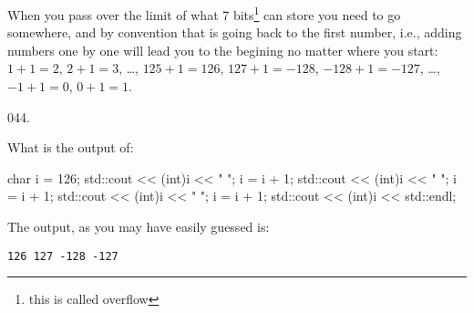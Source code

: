 \documentclass[]{book}
\newenvironment{Shaded}{}{}
\newcommand{\BuiltInTok}[1]{#1}
\newcommand{\DataTypeTok}[1]{\textcolor[rgb]{0.56,0.13,0.00}{#1}}
\newcommand{\DecValTok}[1]{\textcolor[rgb]{0.25,0.63,0.44}{#1}}
\newcommand{\NormalTok}[1]{#1}
\newcommand{\StringTok}[1]{\textcolor[rgb]{0.25,0.44,0.63}{#1}}
\begin{document}
\begin{minipage}{\linewidth}
\begin{minipage}[t]{.485\linewidth}
When you pass over the limit of what 7 bits\footnote{this is called
  overflow} can store you need to go somewhere, and by convention that
is going back to the first number, i.e., adding numbers one by one will
lead you to the begining no matter where you start: \(1+1=2\),
\(2+1=3\), \ldots{}, \(125+1=126\), \(127+1=-128\), \(-128+1=-127\),
\ldots{}, \(-1+1=0\), \(0+1=1\).

\end{minipage}
\end{minipage}

\vspace{2mm}\noindent\hrulefill{}

\begin{minipage}{\linewidth}\noindent
{\tiny 044.}\\
\begin{minipage}[t]{.485\linewidth}

What is the output of:

\begin{framed}

\begin{Shaded}
\begin{Highlighting}[]
\DataTypeTok{char}\NormalTok{ i = }\DecValTok{126}\NormalTok{;}
\BuiltInTok{std::}\NormalTok{cout << (}\DataTypeTok{int}\NormalTok{)i << }\StringTok{" "}\NormalTok{;}
\NormalTok{i = i + }\DecValTok{1}\NormalTok{;}
\BuiltInTok{std::}\NormalTok{cout << (}\DataTypeTok{int}\NormalTok{)i << }\StringTok{" "}\NormalTok{;}
\NormalTok{i = i + }\DecValTok{1}\NormalTok{;}
\BuiltInTok{std::}\NormalTok{cout << (}\DataTypeTok{int}\NormalTok{)i << }\StringTok{" "}\NormalTok{;}
\NormalTok{i = i + }\DecValTok{1}\NormalTok{;}
\BuiltInTok{std::}\NormalTok{cout << (}\DataTypeTok{int}\NormalTok{)i << }\BuiltInTok{std::}\NormalTok{endl;}
\end{Highlighting}
\end{Shaded}

\end{framed}

\end{minipage}
\hfill
\begin{minipage}[t]{.485\linewidth}

The output, as you may have easily guessed is:

\begin{framed}

\begin{verbatim}
126 127 -128 -127
\end{verbatim}

\end{framed}

\end{minipage}
\end{minipage}
\end{document}
